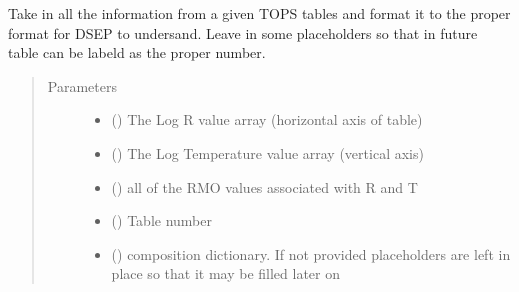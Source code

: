 \documentclass[letterpaper,10pt,english]{sphinxmanual}
\begin{document}
\begin{fulllineitems}
\label{\detokenize{pyTOPSScrape.api:pyTOPSScrape.api.convert.format_opal_comp_table}}
\sphinxAtStartPar
Take in all the information from a given TOPS tables and format it
to the proper format for DSEP to undersand. Leave in some placeholders
so that in future table can be labeld as the proper number.
\begin{quote}\begin{description}
\item[{Parameters}] \leavevmode\begin{itemize}
\item {} 
\sphinxAtStartPar
{} () \textendash{} The Log R value array (horizontal axis of table)

\item {} 
\sphinxAtStartPar
{} () \textendash{} The Log Temperature value array (vertical axis)

\item {} 
\sphinxAtStartPar
{} () \textendash{} all of the RMO values associated with R and T

\item {} 
\sphinxAtStartPar
{} () \textendash{} Table number

\item {} 
\sphinxAtStartPar
{} (\sphinxstyleliteralemphasis{\sphinxupquote{, }}) \textendash{} composition dictionary. If not provided placeholders are left in
place so that it may be filled later on


\end{itemize}
\end{description}
\end{quote}
\end{fulllineitems}
\end{document}
